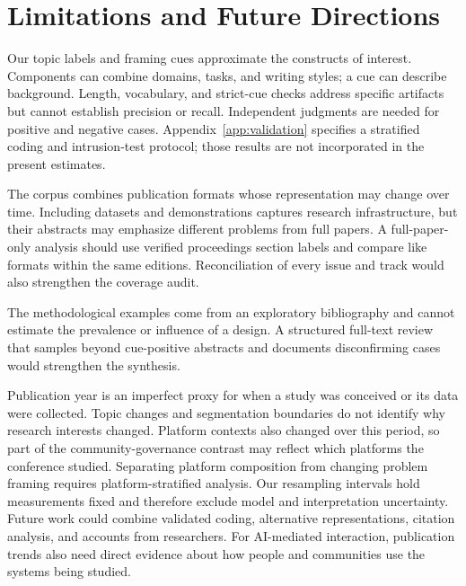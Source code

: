 \section{Limitations and Future Directions}
Our topic labels and framing cues approximate the constructs of interest. Components can combine domains, tasks, and writing styles; a cue can describe background. Length, vocabulary, and strict-cue checks address specific artifacts but cannot establish precision or recall. Independent judgments are needed for positive and negative cases. Appendix~\ref{app:validation} specifies a stratified coding and intrusion-test protocol; those results are not incorporated in the present estimates.

The corpus combines publication formats whose representation may change over time. Including datasets and demonstrations captures research infrastructure, but their abstracts may emphasize different problems from full papers. A full-paper-only analysis should use verified proceedings section labels and compare like formats within the same editions. Reconciliation of every issue and track would also strengthen the coverage audit.

The methodological examples come from an exploratory bibliography and cannot estimate the prevalence or influence of a design. A structured full-text review that samples beyond cue-positive abstracts and documents disconfirming cases would strengthen the synthesis.

Publication year is an imperfect proxy for when a study was conceived or its data were collected. Topic changes and segmentation boundaries do not identify why research interests changed. Platform contexts also changed over this period, so part of the community-governance contrast may reflect which platforms the conference studied. Separating platform composition from changing problem framing requires platform-stratified analysis. Our resampling intervals hold measurements fixed and therefore exclude model and interpretation uncertainty. Future work could combine validated coding, alternative representations, citation analysis, and accounts from researchers. For AI-mediated interaction, publication trends also need direct evidence about how people and communities use the systems being studied.

